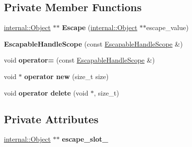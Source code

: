 \subsection*{Private Member Functions}
\begin{DoxyCompactItemize}
\item 
\hyperlink{classv8_1_1internal_1_1_object}{internal\+::\+Object} $\ast$$\ast$ {\bfseries Escape} (\hyperlink{classv8_1_1internal_1_1_object}{internal\+::\+Object} $\ast$$\ast$escape\+\_\+value)\hypertarget{classv8_1_1_escapable_handle_scope_a18a472064c6788f59282ceffa3df30eb}{}\label{classv8_1_1_escapable_handle_scope_a18a472064c6788f59282ceffa3df30eb}

\item 
{\bfseries Escapable\+Handle\+Scope} (const \hyperlink{classv8_1_1_escapable_handle_scope}{Escapable\+Handle\+Scope} \&)\hypertarget{classv8_1_1_escapable_handle_scope_a3e313c7cf1656a443d947303c3220931}{}\label{classv8_1_1_escapable_handle_scope_a3e313c7cf1656a443d947303c3220931}

\item 
void {\bfseries operator=} (const \hyperlink{classv8_1_1_escapable_handle_scope}{Escapable\+Handle\+Scope} \&)\hypertarget{classv8_1_1_escapable_handle_scope_a3fbf3f11d4089d8a730d4171bf8f1bed}{}\label{classv8_1_1_escapable_handle_scope_a3fbf3f11d4089d8a730d4171bf8f1bed}

\item 
void $\ast$ {\bfseries operator new} (size\+\_\+t size)\hypertarget{classv8_1_1_escapable_handle_scope_adf445b7a17fe29a93c9524fe72b65b28}{}\label{classv8_1_1_escapable_handle_scope_adf445b7a17fe29a93c9524fe72b65b28}

\item 
void {\bfseries operator delete} (void $\ast$, size\+\_\+t)\hypertarget{classv8_1_1_escapable_handle_scope_a082688365df2e134a510dd3bc67629af}{}\label{classv8_1_1_escapable_handle_scope_a082688365df2e134a510dd3bc67629af}

\end{DoxyCompactItemize}
\subsection*{Private Attributes}
\begin{DoxyCompactItemize}
\item 
\hyperlink{classv8_1_1internal_1_1_object}{internal\+::\+Object} $\ast$$\ast$ {\bfseries escape\+\_\+slot\+\_\+}\hypertarget{classv8_1_1_escapable_handle_scope_aa452d2cad22ccec2675174e01526d025}{}\label{classv8_1_1_escapable_handle_scope_aa452d2cad22ccec2675174e01526d025}

\end{DoxyCompactItemize}
